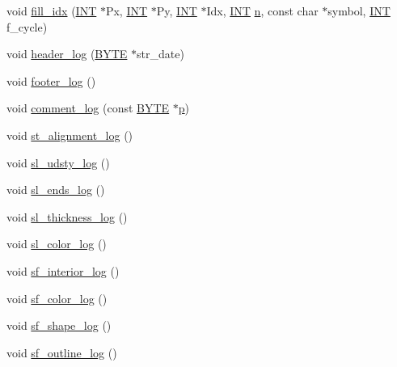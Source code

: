 \begin{DoxyCompactItemize}
\item 
void \mbox{\hyperlink{classmp__graphics_a185e833954f00af0df61939e3b3da294}{fill\+\_\+idx}} (\mbox{\hyperlink{galois_8h_a09fddde158a3a20bd2dcadb609de11dc}{I\+NT}} $\ast$Px, \mbox{\hyperlink{galois_8h_a09fddde158a3a20bd2dcadb609de11dc}{I\+NT}} $\ast$Py, \mbox{\hyperlink{galois_8h_a09fddde158a3a20bd2dcadb609de11dc}{I\+NT}} $\ast$Idx, \mbox{\hyperlink{galois_8h_a09fddde158a3a20bd2dcadb609de11dc}{I\+NT}} \mbox{\hyperlink{simeon_8_c_a7f2cd26777ce0ff3fdaf8d02aacbddfb}{n}}, const char $\ast$symbol, \mbox{\hyperlink{galois_8h_a09fddde158a3a20bd2dcadb609de11dc}{I\+NT}} f\+\_\+cycle)
\item 
void \mbox{\hyperlink{classmp__graphics_a001ad397d28bb3032a3201aac0896ce8}{header\+\_\+log}} (\mbox{\hyperlink{galois_8h_ab6cc7b4aeb6ea31aba2b3fbfc83ff5e6}{B\+Y\+TE}} $\ast$str\+\_\+date)
\item 
void \mbox{\hyperlink{classmp__graphics_a24e948667d548c41a757285e7a22c2c0}{footer\+\_\+log}} ()
\item 
void \mbox{\hyperlink{classmp__graphics_a8ddf22ccd4395ba7d1016acc479a1f88}{comment\+\_\+log}} (const \mbox{\hyperlink{galois_8h_ab6cc7b4aeb6ea31aba2b3fbfc83ff5e6}{B\+Y\+TE}} $\ast$\mbox{\hyperlink{alphabet2_8_c_a533391314665d6bf1b5575e9a9cd8552}{p}})
\item 
void \mbox{\hyperlink{classmp__graphics_a9f7aa1c186791f69881ddbf590835f3e}{st\+\_\+alignment\+\_\+log}} ()
\item 
void \mbox{\hyperlink{classmp__graphics_ab64e78e5ca3f7432533461c116d207c5}{sl\+\_\+udsty\+\_\+log}} ()
\item 
void \mbox{\hyperlink{classmp__graphics_af3c7852b230527041002aac41b8481fd}{sl\+\_\+ends\+\_\+log}} ()
\item 
void \mbox{\hyperlink{classmp__graphics_a3356cadbf9e1ae81ae353c4014d5590a}{sl\+\_\+thickness\+\_\+log}} ()
\item 
void \mbox{\hyperlink{classmp__graphics_a0175960232b3ad314ea4763ea3470c83}{sl\+\_\+color\+\_\+log}} ()
\item 
void \mbox{\hyperlink{classmp__graphics_ab805bb76ca29a586a45209d2ed00b085}{sf\+\_\+interior\+\_\+log}} ()
\item 
void \mbox{\hyperlink{classmp__graphics_a59c3f1bdd7dfc0ac8f3c42e414eb8d98}{sf\+\_\+color\+\_\+log}} ()
\item 
void \mbox{\hyperlink{classmp__graphics_aaf545965ec6b12d004992d685f08a49e}{sf\+\_\+shape\+\_\+log}} ()
\item 
void \mbox{\hyperlink{classmp__graphics_a68c12654baf28f5e749fead0642eee53}{sf\+\_\+outline\+\_\+log}} ()

\end{DoxyCompactItemize}
